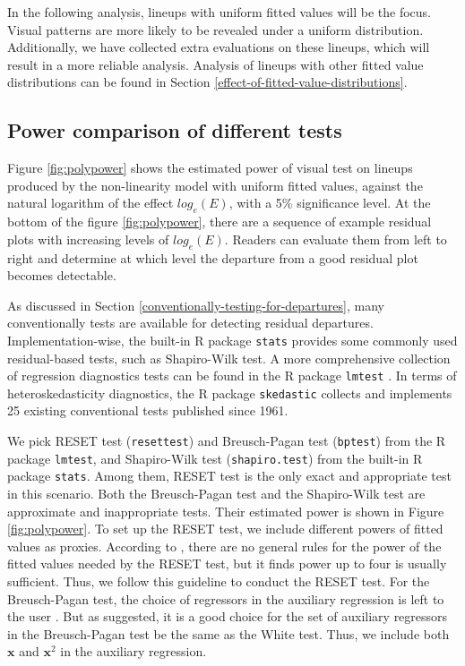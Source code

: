 \documentclass[]{interact}
\theoremstyle{plain}%
\theoremstyle{definition}
\theoremstyle{remark}
\begin{document}
In the following analysis, lineups with uniform fitted values will be
the focus. Visual patterns are more likely to be revealed under a
uniform distribution. Additionally, we have collected extra evaluations
on these lineups, which will result in a more reliable analysis.
Analysis of lineups with other fitted value distributions can be found
in Section \ref{effect-of-fitted-value-distributions}.

\hypertarget{power-comparison-of-different-tests}{%
\subsection{Power comparison of different
tests}\label{power-comparison-of-different-tests}}

Figure \ref{fig:polypower} shows the estimated power of visual test on
lineups produced by the non-linearity model with uniform fitted values,
against the natural logarithm of the effect \(log_e(E)\), with a 5\%
significance level. At the bottom of the figure \ref{fig:polypower},
there are a sequence of example residual plots with increasing levels of
\(log_e(E)\). Readers can evaluate them from left to right and determine
at which level the departure from a good residual plot becomes
detectable.

As discussed in Section \ref{conventionally-testing-for-departures},
many conventionally tests are available for detecting residual
departures. Implementation-wise, the built-in R package \texttt{stats}
provides some commonly used residual-based tests, such as Shapiro-Wilk
test. A more comprehensive collection of regression diagnostics tests
can be found in the R package \texttt{lmtest} \citep{lmtest}. In terms
of heteroskedasticity diagnostics, the R package \texttt{skedastic}
\citep{skedastic} collects and implements 25 existing conventional tests
published since 1961.

We pick RESET test (\texttt{resettest}) and Breusch-Pagan test
(\texttt{bptest}) from the R package \texttt{lmtest}, and Shapiro-Wilk
test (\texttt{shapiro.test}) from the built-in R package \texttt{stats}.
Among them, RESET test is the only exact and appropriate test in this
scenario. Both the Breusch-Pagan test and the Shapiro-Wilk test are
approximate and inappropriate tests. Their estimated power is shown in
Figure \ref{fig:polypower}. To set up the RESET test, we include
different powers of fitted values as proxies. According to
\citet{ramsey_tests_1969}, there are no general rules for the power of
the fitted values needed by the RESET test, but it finds power up to
four is usually sufficient. Thus, we follow this guideline to conduct
the RESET test. For the Breusch-Pagan test, the choice of regressors in
the auxiliary regression is left to the user
\citep{breusch_simple_1979}. But as \citet{waldman1983note} suggested,
it is a good choice for the set of auxiliary regressors in the
Breusch-Pagan test be the same as the White test. Thus, we include both
\(\boldsymbol{x}\) and \(\boldsymbol{x}^2\) in the auxiliary regression.
\end{document}
